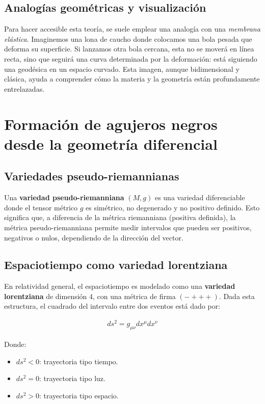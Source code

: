 \documentclass{aleph-revista}
\begin{document}
\subsection*{Analogías geométricas y visualización}
Para hacer accesible esta teoría, se suele emplear una analogía con una \textit{membrana elástica}. Imaginemos una lona de caucho donde colocamos una bola pesada que deforma su superficie. Si lanzamos otra bola cercana, esta no se moverá en línea recta, sino que seguirá una curva determinada por la deformación: está siguiendo una geodésica en un espacio curvado. Esta imagen, aunque bidimensional y clásica, ayuda a comprender cómo la materia y la geometría están profundamente entrelazadas.
\section{Formación de agujeros negros desde la geometría diferencial}

\subsection{Variedades pseudo-riemannianas}

Una \textbf{variedad pseudo-riemanniana} \((M, g)\) es una variedad diferenciable donde el tensor métrico \(g\) es simétrico, no degenerado y no positivo definido. Esto significa que, a diferencia de la métrica riemanniana (positiva definida), la métrica pseudo-riemanniana permite medir intervalos que pueden ser positivos, negativos o nulos, dependiendo de la dirección del vector.

\subsection{Espaciotiempo como variedad lorentziana}

En relatividad general, el espaciotiempo es modelado como una \textbf{variedad lorentziana} de dimensión 4, con una métrica de firma \((-+++) \). Dada esta estructura, el cuadrado del intervalo entre dos eventos está dado por:

\begin{align*}
ds^2 = g_{\mu\nu} dx^\mu dx^\nu
\end{align*}

Donde:
\begin{itemize}
  \item \(ds^2 < 0\): trayectoria tipo tiempo.
  \item \(ds^2 = 0\): trayectoria tipo luz.
  \item \(ds^2 > 0\): trayectoria tipo espacio.
\end{itemize}
\end{document}

